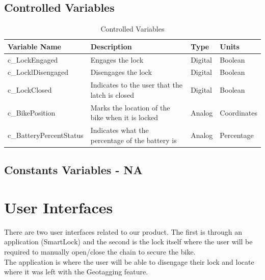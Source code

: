 \documentclass[12pt, titlepage]{article}
\begin{document}
\subsection{Controlled Variables}

\begin{table}[hp]
\caption{\label{Controlled Variables} Controlled Variables}
\begin{tabular}{| p{} | p{} | p{} | p{} |}
 \hline
 Variable Name & Description & Type & Units \\ 
 \hline
 c\_LockEngaged & Engages the lock & Digital & Boolean \\ 
  \hline
 c\_LocklDisengaged & Disengages the lock & Digital & Boolean \\ 
  \hline
 c\_LockClosed& Indicates to the user that the latch is closed & Digital & Boolean \\ 
  \hline
 c\_BikePosition & Marks the location of the bike when it is locked & Analog & Coordinates \\ 
  \hline
 c\_BatteryPercentStatus & Indicates what the percentage of the battery is & Analog & Percentage \\ 
 \hline
\end{tabular}
\end{table}

\subsection{Constants Variables - NA}

\newpage
\section{User Interfaces}
There are two user interfaces related to our product. The first is through an application (SmartLock) and the second is the lock itself where the user will be required to manually open/close the chain to secure the bike. \\


The application is where the user will be able to disengage their lock and locate where it was left with the Geotagging feature. \\
\end{document}
